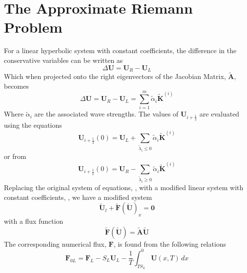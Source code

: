 \section{The Approximate Riemann Problem}
For a linear hyperbolic system with constant coefficients, the difference in the conservative variables can be written as
\begin{equation}
	\Delta \boldsymbol{U} = \boldsymbol{U}_R - \boldsymbol{U}_L
\end{equation}
Which when projected onto the right eigenvectors of the Jacobian Matrix, $\tilde{\boldsymbol{A}}$, becomes
\begin{equation}\label{eqn:datadifference}
	\Delta \boldsymbol{U} = \boldsymbol{U}_R - \boldsymbol{U}_L = \sum_{i=1}^m \tilde{\alpha}_i \tilde{\boldsymbol{K}}^{\left(i\right)}
\end{equation}
Where $\tilde{\alpha}_i$ are the associated wave strengths. The values of $\boldsymbol{U}_{i+\frac{1}{2}}$ are evaluated using the equations
\begin{equation}\label{eqn:Usum1}
	\boldsymbol{U}_{i+\frac{1}{2}}\left(0\right) = \boldsymbol{U}_L + \sum_{\tilde{\lambda}_i \le 0} \tilde{\alpha}_i \tilde{\boldsymbol{K}}^{\left(i\right)}
\end{equation}
or from
\begin{equation}\label{eqn:Usum2}
	\boldsymbol{U}_{i+\frac{1}{2}}\left(0\right) = \boldsymbol{U}_R - \sum_{\tilde{\lambda}_i \ge 0} \tilde{\alpha}_i \tilde{\boldsymbol{K}}^{\left(i\right)}
\end{equation}
Replacing the original system of equations, , with a modified linear system with constant coefficients, , we have a modified system
\begin{equation}
	\tilde{\boldsymbol{U}}_t + \tilde{\boldsymbol{F}}\left(\tilde{\boldsymbol{U}}\right)_x = \boldsymbol{0}
\end{equation}
with a flux function
\begin{equation}\label{eqn:FluxDef}
	\tilde{\boldsymbol{F}}\left(\tilde{\boldsymbol{U}}\right) = \tilde{\boldsymbol{A}}\tilde{\boldsymbol{U}}
\end{equation}
The corresponding numerical flux, $\boldsymbol{F}$, is found from the following relations
\begin{equation}\label{eqn:flux1}
	\boldsymbol{F}_{0L} = \boldsymbol{F}_L - S_L \boldsymbol{U}_L - \frac{1}{T} \int_{TS_L}^{0} \boldsymbol{U}\left(x,T\right)\,dx
\end{equation}
